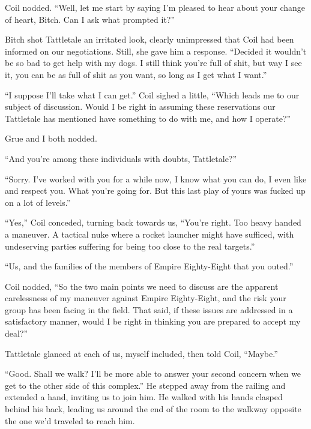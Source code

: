 Coil nodded.  ``Well, let me start by saying I'm pleased to hear about your change of heart, Bitch.  Can I ask what prompted it?''



Bitch shot Tattletale an irritated look, clearly unimpressed that Coil had been informed on our negotiations.  Still, she gave him a response.  ``Decided it wouldn't be so bad to get help with my dogs.  I still think you're full of shit, but way I see it, you can be as full of shit as you want, so long as I get what I want.''



``I suppose I'll take what I can get.''  Coil sighed a little, ``Which leads me to our subject of discussion.  Would I be right in assuming these reservations our Tattletale has mentioned have something to do with me, and how I operate?''



Grue and I both nodded.



``And you're among these individuals with doubts, Tattletale?''



``Sorry.  I've worked with you for a while now, I know what you can do, I even like and respect you.  What you're going for.  But this last play of yours was fucked up on a lot of levels.''



``Yes,'' Coil conceded, turning back towards us, ``You're right.  Too heavy handed a maneuver.  A tactical nuke where a rocket launcher might have sufficed, with undeserving parties suffering for being too close to the real targets.''



``Us, and the families of the members of Empire Eighty-Eight that you outed.''



Coil nodded, ``So the two main points we need to discuss are the apparent carelessness of my maneuver against Empire Eighty-Eight, and the risk your group has been facing in the field.  That said, if these issues are addressed in a satisfactory manner, would I be right in thinking you are prepared to accept my deal?''



Tattletale glanced at each of us, myself included, then told Coil, ``Maybe.''



``Good.  Shall we walk?  I'll be more able to answer your second concern when we get to the other side of this complex.'' He stepped away from the railing and extended a hand, inviting us to join him.  He walked with his hands clasped behind his back, leading us around the end of the room to the walkway opposite the one we'd traveled to reach him.



